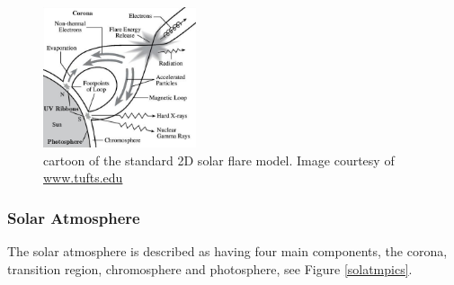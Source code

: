\begin{figure}[H]
  \begin{center}
  \includegraphics[width=0.40\textwidth]{flare}
  \caption{cartoon of the standard 2D solar flare model. Image courtesy of \href{http://ase.tufts.edu/cosmos/print_images.asp?id=47}{www.tufts.edu}}\label{flare-cartoon}
\end{center}
\end{figure}




\subsubsection{Solar Atmosphere}
The solar atmosphere is described as having four main components, the corona, transition region, chromosphere and photosphere, see Figure \ref{solatmpics}.

